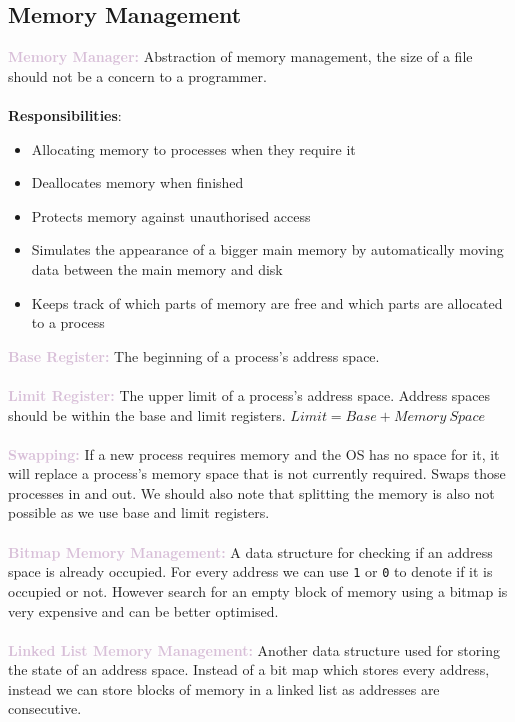 \documentclass[a4paper,10pt]{article}
\begin{document}
\subsection*{Memory Management}
\textcolor{Thistle}{\textbf{Memory Manager:}} Abstraction of memory management, the size of a file should not be a concern to a programmer. \\\\
\textbf{Responsibilities}: 
\begin{itemize}
\item Allocating memory to processes when they require it 
\item Deallocates memory when finished 
\item Protects memory against unauthorised access 
\item Simulates the appearance of a bigger main memory by automatically moving data between the main memory and disk 
\item Keeps track of which parts of memory are free and which parts are allocated to a process 
\end{itemize}
\textcolor{Thistle}{\textbf{Base Register:}} The beginning of a process's address space. \\\\
\textcolor{Thistle}{\textbf{Limit Register:}} The upper limit of a process's address space. Address spaces should be within the base and limit registers. $Limit = Base + Memory \ Space$ \\\\
\textcolor{Thistle}{\textbf{Swapping:}} If a new process requires memory and the OS has no space for it, it will replace a process's memory space that is not currently required. Swaps those processes in and out.  We should also note that splitting the memory is also not possible as we use base and limit registers. \\\\
\textcolor{Thistle}{\textbf{Bitmap Memory Management:}} A data structure for checking if an address space is already occupied. For every address we can use \texttt{1} or \texttt{0} to denote if it is occupied or not. However search for an empty block of memory using a bitmap is very expensive and can be better optimised. \\\\
\textcolor{Thistle}{\textbf{Linked List Memory Management: }} Another data structure used for storing the state of an address space. Instead of a bit map which stores every address, instead we can store blocks of memory in a linked list as addresses are consecutive.  \\\\
\end{document}
